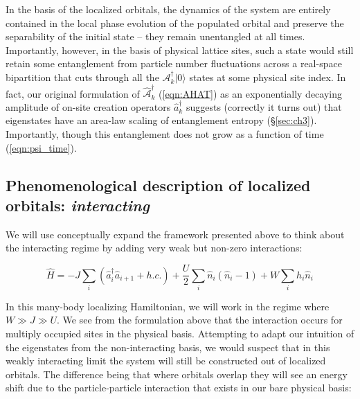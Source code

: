 In the basis of the localized orbitals, the dynamics of the system are entirely contained in the local phase evolution of the populated orbital and preserve the separability of the initial state -- they remain unentangled at all times. Importantly, however, in the basis of physical lattice sites, such a state would still retain some entanglement from particle number fluctuations across a real-space bipartition that cuts through all the $\mathcal{A}^\dagger_k |0\rangle$ states at some physical site index. In fact, our original formulation of $\hat{\mathcal{A}}_k^\dagger$ (\ref{eqn:AHAT}) as an exponentially decaying amplitude of on-site creation operators $\hat{a}_k^\dagger$ suggests (correctly it turns out) that eigenstates have an area-law scaling of entanglement entropy (\S \ref{sec:ch3}). Importantly, though this entanglement does not grow as a function of time (\ref{eqn:psi_time}).


\subsection{Phenomenological description of localized orbitals: \emph{interacting}} 

We will use conceptually expand the framework presented above to think about the interacting regime by adding very weak but non-zero interactions:

\begin{equation}
\label{eqn:mblham}
\hat{H} = -J\sum_i \left ( \hat{a}_i^\dagger \hat{a}_{i+1} + h.c. \right ) + \frac{U}{2} \sum_i \hat{n}_i \left (\hat{n}_i - 1 \right ) + W \sum_i h_i \hat{n}_i
\end{equation}

In this many-body localizing Hamiltonian, we will work in the regime where $W\gg J \gg U$. We see from the formulation above that the interaction occurs for multiply occupied sites in the physical basis. Attempting to adapt our intuition of the eigenstates from the non-interacting basis, we would suspect that in this weakly interacting limit the system will still be constructed out of localized orbitals. The difference being that where orbitals overlap they will see an energy shift due to the particle-particle interaction that exists in our bare physical basis:

